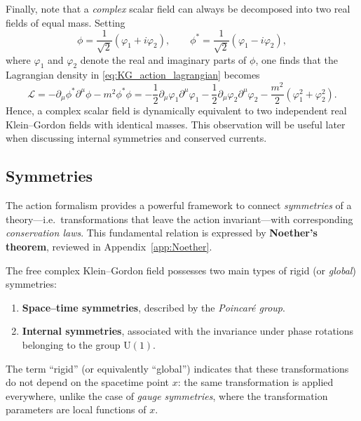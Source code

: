 Finally, note that a \textit{complex} scalar field can always be decomposed into two real fields of equal mass.
Setting
\[
    \phi = \frac{1}{\sqrt{2}}(\varphi_1 + i \varphi_2), \qquad
    \phi^{\ast} = \frac{1}{\sqrt{2}}(\varphi_1 - i \varphi_2),
\]
where $\varphi_1$ and $\varphi_2$ denote the real and imaginary parts of $\phi$, one finds that the Lagrangian density in \eqref{eq:KG_action_lagrangian} becomes
\begin{equation}
    \mathcal{L}
    = -\partial_{\mu}\phi^{\ast}\partial^{\mu}\phi - m^2\phi^{\ast}\phi
    = -\frac{1}{2}\partial_{\mu}\varphi_1\partial^{\mu}\varphi_1
    -\frac{1}{2}\partial_{\mu}\varphi_2\partial^{\mu}\varphi_2
    -\frac{m^2}{2}(\varphi_1^2 + \varphi_2^2).
    \label{eq:KG_real_lagrangian}
\end{equation}
Hence, a complex scalar field is dynamically equivalent to two independent real Klein--Gordon fields with identical masses.
This observation will be useful later when discussing internal symmetries and conserved currents.

\subsection{Symmetries}

The action formalism provides a powerful framework to connect \textit{symmetries} of a theory—i.e.\ transformations that leave the action invariant—with corresponding \textit{conservation laws}.
This fundamental relation is expressed by \textbf{Noether’s theorem}, reviewed in Appendix~\ref{app:Noether}.

The free complex Klein--Gordon field possesses two main types of rigid (or \textit{global}) symmetries:
\begin{enumerate}
    \item \textbf{Space–time symmetries}, described by the \textit{Poincaré group}.
    \item \textbf{Internal symmetries}, associated with the invariance under phase rotations belonging to the group \(\mathrm{U}(1)\).
\end{enumerate}
The term “rigid” (or equivalently “global”) indicates that these transformations do not depend on the spacetime point \(x\): the same transformation is applied everywhere, unlike the case of \textit{gauge symmetries}, where the transformation parameters are local functions of \(x\).

